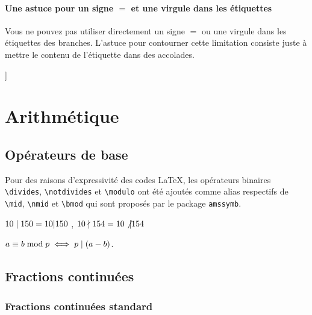 \documentclass[12pt,a4paper]{article}
\newcommand\env[1]{\texttt{#1}}
\newcommand\macro[1]{\env{\textbackslash{}#1}}
\theoremstyle{definition}
\begin{document}


\paragraph{Une astuce pour un signe $=$ et une virgule dans les étiquettes}

Vous ne pouvez pas utiliser directement un signe $=$ ou une virgule dans les étiquettes des branches. L'astuce pour contourner cette limitation consiste juste à mettre le contenu de l'étiquette dans des accolades.

\begin{latexex}
\begin{probatree}
[
    [$A$, apweight = {$a = 0,1$}]
    [$B$, bpweight = $b$]
]
\end{probatree}
\end{latexex}


\section{Arithmétique}

\subsection{Opérateurs de base}

Pour des raisons d'expressivité des codes \LaTeX{}, les opérateurs binaires \macro{divides}, \macro{notdivides} et \macro{modulo} ont été ajoutés comme alias respectifs de \macro{mid}, \macro{nmid} et \macro{bmod} qui sont proposés par le package \verb+amssymb+.

\begin{latexex}
$10 \mid 150 = 10 | 150$ ,
$10 \nmid 154 = 10 \not| 154$

$a \equiv b \bmod p
 \iff
 p \mid (a - b)$.
\end{latexex}



\subsection{Fractions continuées}

\subsubsection{Fractions continuées standard}
\end{document}
